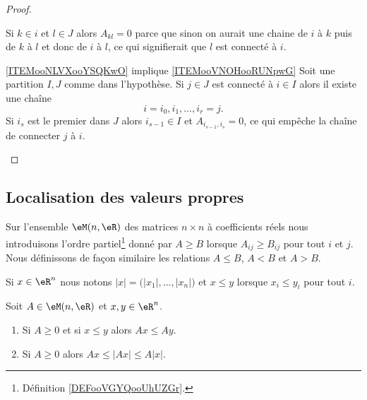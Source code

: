 \begin{proof}
\begin{subproof}
            Si \( k\in i\) et \( l\in J\) alors \( A_{kl}=0\) parce que sinon on aurait une chaine de \( i\) à \( k\) puis de \( k\) à \( l\) et donc de \( i\) à \( l\), ce qui signifierait que \( l\) est connecté à \( i\).

        \item[\ref{ITEMooNLVXooYSQKwO} implique \ref{ITEMooVNOHooRUNpwG}]
            Soit une partition \( I,J\) comme dans l'hypothèse. Si \( j\in J\) est connecté à \( i\in I\) alors il existe une chaîne
            \begin{equation}
                i=i_0,i_1,\ldots, i_r=j.
            \end{equation}
            Si \( i_s\) est le premier dans \( J\) alors \( i_{s-1}\in I\) et \( A_{i_{s-1},i_s}=0\), ce qui empêche la chaîne de connecter \( j\) à \( i\).
    \end{subproof}
\end{proof}

\subsection{Localisation des valeurs propres}

Sur l'ensemble \( \eM(n,\eR)\) des matrices \( n\times n\) à coefficients réels nous introduisons l'ordre partiel\footnote{Définition \ref{DEFooVGYQooUhUZGr}.} donné par \( A\geq B\) lorsque \( A_{ij}\geq B_{ij}\) pour tout \( i\) et \( j\). Nous définissons de façon similaire les relations \( A\leq B\), \( A<B\) et \( A>B\).

Si \( x\in \eR^n\) nous notons \( | x |=\big( | x_1 |,\ldots, | x_n | \big)\) et \( x\leq y\) lorsque \( x_i\leq y_i\) pour tout \( i\).

\begin{proposition}
    Soit \( A\in \eM(n,\eR)\) et \( x,y\in \eR^n\).
    \begin{enumerate}
        \item
            Si \( A\geq 0\) et si \( x\leq y\) alors \( Ax\leq Ay\).
        \item
            Si \( A\geq 0\) alors \( Ax\leq | Ax |\leq A| x |\).
    \end{enumerate}
\end{proposition}

